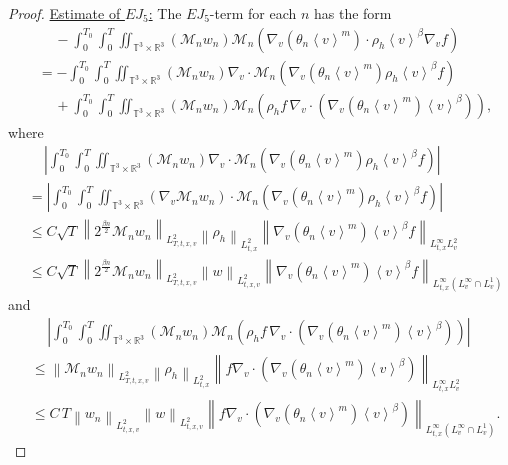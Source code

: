 \documentclass[11pt,american, reqno]{amsart}
\numberwithin{equation}{section}
\newcommand{\R}{\mathbb R}
\newcommand{\1}{\mathds{1}}
\newcommand{\Ni}{\noindent}
\newcommand{\CalM}{\mathcal{M}}
\newcommand{\vpran}[1]{\left(#1\right)}
\newcommand{\norm}[1]{\left\lVert#1\right\rVert}
\newcommand{\abs}[1]{\left\vert#1\right\vert}
\newcommand{\vint}[1]{\left\langle#1\right\rangle}
\newcommand{\T}{\mathbb{T}}
\numberwithin{equation}{section}
\begin{document}
\begin{proof}
\Ni \underline{Estimate of $EJ_5$:} The $EJ_5$-term for each $n$ has the form
\begin{align*}
& \quad \,
 - \int_0^{T_0} \int_0^T \iint_{\T^3 \times \R^3}
   \vpran{\CalM_n w_n}
   \CalM_n \vpran{\nabla_v \vpran{\theta_n \vint{v}^m}    \cdot \rho_h \vint{v}^\beta
   \nabla_v f}
\\
& = - \int_0^{T_0} \int_0^T \iint_{\T^3 \times \R^3}
   \vpran{\CalM_n w_n}
   \nabla_v \cdot \CalM_n \vpran{\nabla_v \vpran{\theta_n \vint{v}^m}    \rho_h \vint{v}^\beta
   f}
\\
& \quad \,
   +  \int_0^{T_0} \int_0^T \iint_{\T^3 \times \R^3}
   \vpran{\CalM_n w_n}
   \CalM_n \vpran{\rho_h 
   f \, \nabla_v \cdot \vpran{\nabla_v \vpran{\theta_n \vint{v}^m}    \vint{v}^\beta}},
\end{align*}
where
\begin{align*}
& \quad \,
 \abs{\int_0^{T_0} \int_0^T \iint_{\T^3 \times \R^3}
   \vpran{\CalM_n w_n}
   \nabla_v \cdot \CalM_n \vpran{\nabla_v \vpran{\theta_n \vint{v}^m}    \rho_h \vint{v}^\beta
   f}}
\\
&= \abs{\int_0^{T_0} \int_0^T \iint_{\T^3 \times \R^3}
   \vpran{\nabla_v \CalM_n w_n}
   \cdot \CalM_n \vpran{\nabla_v \vpran{\theta_n \vint{v}^m}    \rho_h \vint{v}^\beta
   f}}
\\
& \leq 
 C \sqrt{T}
 \norm{2^{\frac{\beta n}{2}}\CalM_n w_n}_{L^2_{T,t,x,v}}
 \norm{\rho_h}_{L^2_{t,x}}
 \norm{\nabla_v \vpran{\theta_n \vint{v}^m} \vint{v}^\beta f}_{L^\infty_{t,x}L^2_v}
\\
& \leq 
 C \sqrt{T}
 \norm{2^{\frac{\beta n}{2}}\CalM_n w_n}_{L^2_{T,t,x,v}}
 \norm{w}_{L^2_{t,x,v}}
 \norm{\nabla_v \vpran{\theta_n \vint{v}^m} \vint{v}^\beta f}_{L^\infty_{t,x}(L^\infty_v \cap L^1_v)}
\end{align*}
and
\begin{align*}
& \quad \,
\abs{\int_0^{T_0} \int_0^T \iint_{\T^3 \times \R^3}
   \vpran{\CalM_n w_n}
   \CalM_n \vpran{\rho_h 
   f \, \nabla_v \cdot \vpran{\nabla_v \vpran{\theta_n \vint{v}^m}    \vint{v}^\beta}}}
\\
& \leq 
\norm{\CalM_n w_n}_{L^2_{T,t,x,v}}
\norm{\rho_h}_{L^2_{t,x}}
\norm{f \nabla_v \cdot \vpran{\nabla_v \vpran{\theta_n \vint{v}^m}    \vint{v}^\beta}}_{L^\infty_{t,x}L^2_v}
\\
& \leq  
 C \, T
 \norm{w_n}_{L^2_{t,x,v}}
 \norm{w}_{L^2_{t,x,v}}
 \norm{f \nabla_v \cdot \vpran{\nabla_v \vpran{\theta_n \vint{v}^m}    \vint{v}^\beta}}_{L^\infty_{t,x}(L^\infty_v \cap L^1_v)}. 
\end{align*}

\end{proof}
\end{document}
